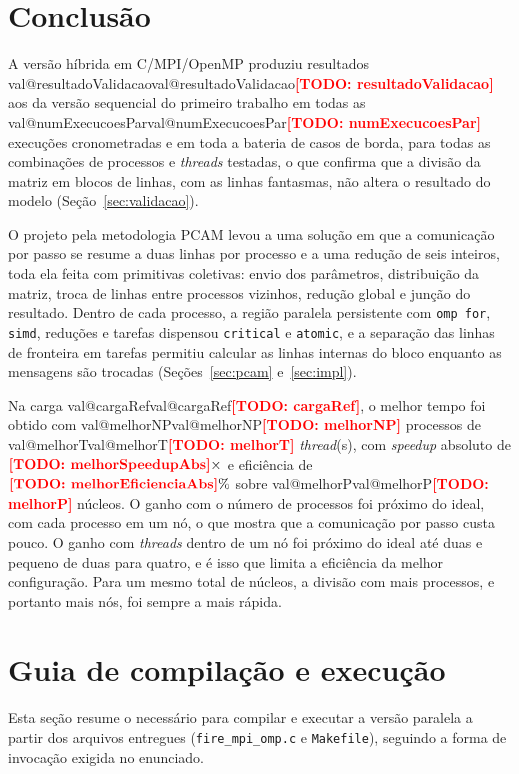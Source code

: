 \documentclass[11pt,a4paper]{article}
\makeatletter
\newcommand{\TODO}[1]{\textcolor{red}{\textbf{[TODO: #1]}}}
\newcommand{\pct}{\%}
\newcommand{\Valor}[1]{\ifcsname val@#1\endcsname\csname val@#1\endcsname\else\TODO{#1}\fi}
\makeatother
\begin{document}
\section{Conclusão}
\label{sec:conclusao}

A versão híbrida em C/MPI/OpenMP produziu resultados \Valor{resultadoValidacao} aos da versão sequencial do primeiro trabalho em todas as \Valor{numExecucoesPar} execuções cronometradas e em toda a bateria de casos de borda, para todas as combinações de processos e \emph{threads} testadas, o que confirma que a divisão da matriz em blocos de linhas, com as linhas fantasmas, não altera o resultado do modelo (Seção~\ref{sec:validacao}).

O projeto pela metodologia PCAM levou a uma solução em que a comunicação por passo se resume a duas linhas por processo e a uma redução de seis inteiros, toda ela feita com primitivas coletivas: envio dos parâmetros, distribuição da matriz, troca de linhas entre processos vizinhos, redução global e junção do resultado. Dentro de cada processo, a região paralela persistente com \texttt{omp for}, \texttt{simd}, reduções e tarefas dispensou \texttt{critical} e \texttt{atomic}, e a separação das linhas de fronteira em tarefas permitiu calcular as linhas internas do bloco enquanto as mensagens são trocadas (Seções~\ref{sec:pcam} e~\ref{sec:impl}).

Na carga \Valor{cargaRef}, o melhor tempo foi obtido com \Valor{melhorNP} processos de \Valor{melhorT} \emph{thread}(s), com \emph{speedup} absoluto de $\Valor{melhorSpeedupAbs}\times$ e eficiência de $\Valor{melhorEficienciaAbs}\pct$ sobre \Valor{melhorP} núcleos. O ganho com o número de processos foi próximo do ideal, com cada processo em um nó, o que mostra que a comunicação por passo custa pouco. O ganho com \emph{threads} dentro de um nó foi próximo do ideal até duas e pequeno de duas para quatro, e é isso que limita a eficiência da melhor configuração. Para um mesmo total de núcleos, a divisão com mais processos, e portanto mais nós, foi sempre a mais rápida.

\appendix

\section{Guia de compilação e execução}
\label{sec:apendice-execucao}

Esta seção resume o necessário para compilar e executar a versão paralela a partir dos arquivos entregues (\texttt{fire\_mpi\_omp.c} e \texttt{Makefile}), seguindo a forma de invocação exigida no enunciado.
\end{document}
